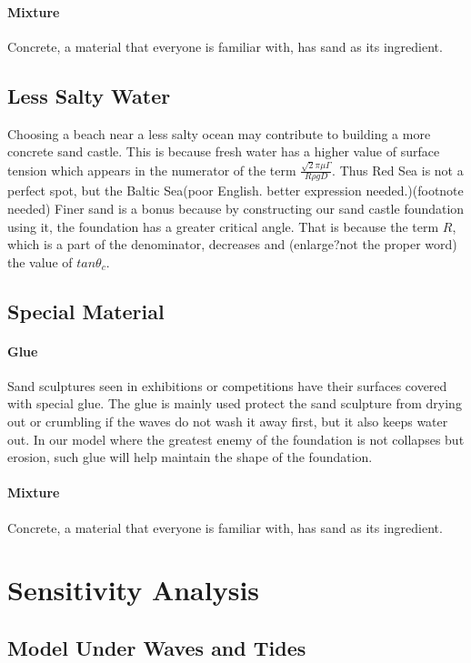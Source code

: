 \documentclass[12pt]{article}
\begin{document}
\paragraph{Mixture}
Concrete, a material that everyone is familiar with, has sand as its ingredient.
\subsection{Less Salty Water}
Choosing a beach near a less salty ocean may contribute to building a more concrete sand castle. This is because fresh water has a higher value of surface tension which appears in the numerator of the term $\frac{\sqrt{2}\pi\mu\Gamma}{R\rho gD}$. Thus Red Sea is not a perfect spot, but the Baltic Sea(poor English. better expression needed.)(footnote needed)
Finer sand is a bonus because by constructing our sand castle foundation using it, the foundation has a greater critical angle. That is because the term $R$, which is a part of the denominator, decreases and (enlarge?not the proper word) the value of $tan\theta_c$.
\subsection{Special Material}
\paragraph{Glue}
Sand sculptures seen in exhibitions or competitions have their surfaces covered with special glue. The glue is mainly used protect the sand sculpture from drying out or crumbling if the waves do not wash it away first, but it also keeps water out. In our model where the greatest enemy of the foundation is not collapses but erosion, such glue will help maintain the shape of the foundation.
\paragraph{Mixture}
Concrete, a material that everyone is familiar with, has sand as its ingredient.

\section{Sensitivity Analysis}
\subsection{Model Under Waves and Tides}
\end{document}
